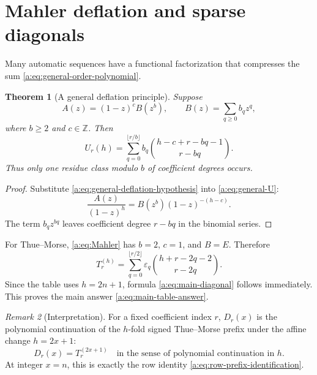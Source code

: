\documentclass[11pt,a4paper,oneside,openany]{book}
\numberwithin{equation}{chapter}
\newtheorem{theorem}{Theorem}[chapter]
\theoremstyle{definition}
\theoremstyle{remark}
\newtheorem{remark}[theorem]{Remark}
\newcommand{\Z}{\mathbb Z}
\newcommand{\eps}{\varepsilon}
\newcommand{\Diag}{D}
\newcommand{\Prefix}{T}
\begin{document}
\section{Mahler deflation and sparse diagonals}

Many automatic sequences have a functional factorization that compresses the
sum \eqref{a:eq:general-order-polynomial}.

\begin{theorem}[A general deflation principle]
Suppose
\begin{equation}
 A(z)=(1-z)^cB(z^b),
 \qquad
 B(z)=\sum_{q\ge0}b_qz^q,
 \label{a:eq:general-deflation-hypothesis}
\end{equation}
where \(b\ge2\) and \(c\in\Z\).  Then
\begin{equation}
 \boxed{
 U_r(h)=
 \sum_{q=0}^{\lfloor r/b\rfloor}b_q
 \binom{h-c+r-bq-1}{r-bq}.}
 \label{a:eq:general-deflation}
\end{equation}
Thus only one residue class modulo \(b\) of coefficient degrees occurs.
\end{theorem}

\begin{proof}
Substitute \eqref{a:eq:general-deflation-hypothesis} into
\eqref{a:eq:general-U}:
\[
 \frac{A(z)}{(1-z)^h}=B(z^b)(1-z)^{-(h-c)}.
\]
The term \(b_qz^{bq}\) leaves coefficient degree \(r-bq\) in the binomial
series.
\end{proof}

For Thue--Morse, \eqref{a:eq:Mahler} has \(b=2\), \(c=1\), and \(B=E\).
Therefore
\begin{equation}
 \Prefix_r^{(h)}
 =\sum_{q=0}^{\lfloor r/2\rfloor}
 \eps_q\binom{h+r-2q-2}{r-2q}.
 \label{a:eq:prefix-order-polynomial}
\end{equation}
Since the table uses \(h=2n+1\), formula \eqref{a:eq:main-diagonal} follows
immediately.  This proves the main answer \eqref{a:eq:main-table-answer}.

\begin{remark}[Interpretation]
For a fixed coefficient index \(r\), \(\Diag_r(x)\) is the polynomial
continuation of the \(h\)-fold signed Thue--Morse prefix under the affine
change \(h=2x+1\):
\begin{equation}
 \Diag_r(x)=\Prefix_r^{(2x+1)}
 \quad\text{in the sense of polynomial continuation in }h.
 \label{a:eq:polynomial-interpolation-interpretation}
\end{equation}
At integer \(x=n\), this is exactly the row identity
\eqref{a:eq:row-prefix-identification}.
\end{remark}
\end{document}
